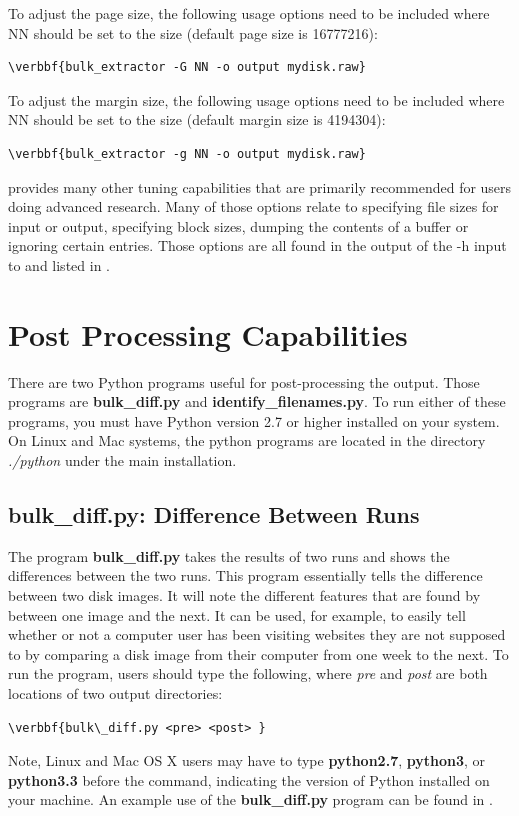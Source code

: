 \documentclass[11pt]{article} %
\begin{document}
To adjust the page size, the following usage options need to be included where NN should be set to the size (default page size is 16777216):
\begin{Verbatim}[commandchars=\\\{\}]
\verbbf{bulk_extractor -G NN -o output mydisk.raw}
\end{Verbatim}

To adjust the margin size, the following usage options need to be included where NN should be set to the size (default margin size is 4194304):
\begin{Verbatim}[commandchars=\\\{\}]
\verbbf{bulk_extractor -g NN -o output mydisk.raw}
\end{Verbatim}

\bulk provides many other tuning capabilities that are primarily recommended for users doing advanced research. Many of those options relate to specifying file sizes for input or output, specifying block sizes, dumping the contents of a buffer or ignoring certain entries. Those options are all found in the output of the -h input to \bulk and listed in \textbf{}.

\section{Post Processing Capabilities}
\label{PostProcessing}
There are two Python programs useful for post-processing the \bulk output. Those programs are \textbf{bulk\_diff.py} and \textbf{identify\_filenames.py}. To run either of these programs, you must have Python version 2.7 or higher installed on your system. On Linux and Mac systems, the \bulk python programs are located in the directory \textit{./python} under the main \bulk installation. \\

\subsection{bulk\_diff.py: Difference Between Runs}
The program \textbf{bulk\_diff.py} takes the results of two \bulk runs and shows the differences between the two runs. This program essentially tells the difference between two disk images. It will note the different features that are found by \bulk between one image and the next. It can be used, for example, to easily tell whether or not a computer user has been visiting websites they are not supposed to by comparing a disk image from their computer from one week to the next. To run the program, users should type the following, where \textit{pre} and \textit{post} are both locations of two \bulk output directories:
\begin{Verbatim}[commandchars=\\\{\}]
\verbbf{bulk\_diff.py <pre> <post> }
\end{Verbatim} 
Note, Linux and Mac OS X users may have to type \textbf{python2.7}, \textbf{python3}, or \textbf{python3.3} before the command, indicating the version of Python installed on your machine. An example use of the \textbf{bulk\_diff.py} program can be found in .
\end{document}
